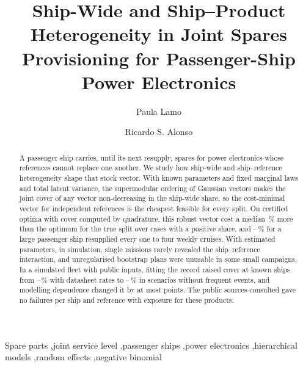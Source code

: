 \documentclass[preprint,12pt]{elsarticle}
\begin{document}
\begin{frontmatter}

\title{Ship-Wide and Ship--Product Heterogeneity in Joint Spares Provisioning
for Passenger-Ship Power Electronics}

\author[uc]{Paula Lamo}

\author[unir,air]{Ricardo S. Alonso}


\begin{abstract}
A passenger ship carries, until its next resupply, spares for power
electronics whose references cannot replace one another. We study
how ship-wide and ship--reference heterogeneity shape that stock vector. With
known parameters and fixed marginal laws and total latent variance, the
supermodular ordering of Gaussian vectors makes the joint cover of any vector
non-decreasing in the ship-wide share, so the cost-minimal vector for
independent references is the cheapest feasible for every split. On
certified optima with cover computed by quadrature, this robust vector cost a
median \seIndCertMed\,\% more than the optimum for the true split over
\seCertPos{} cases with a positive share, and \shPremFourteen--\shPremMax\,\%
for a large passenger ship resupplied every one to four weekly cruises. With
estimated parameters, in simulation, single missions rarely revealed the
ship--reference interaction, and unregularised bootstrap plans were unusable
in some small campaigns. In a simulated fleet with public inputs, fitting the
record raised cover at known ships from \fdMtbfLo--\fdMtbfHi\,\% with
datasheet rates to \fdFitKLo--\fdFitKHi\,\% in scenarios without frequent
events, and modelling dependence changed it by at most \fdAbsDcMax{} points.
The public sources consulted gave no failures per ship and reference with
exposure for these products.
\end{abstract}

\begin{keyword}
Spare parts \sep joint service level \sep passenger ships \sep power
electronics \sep hierarchical models \sep random effects \sep negative
binomial
\end{keyword}

\end{frontmatter}
\end{document}
